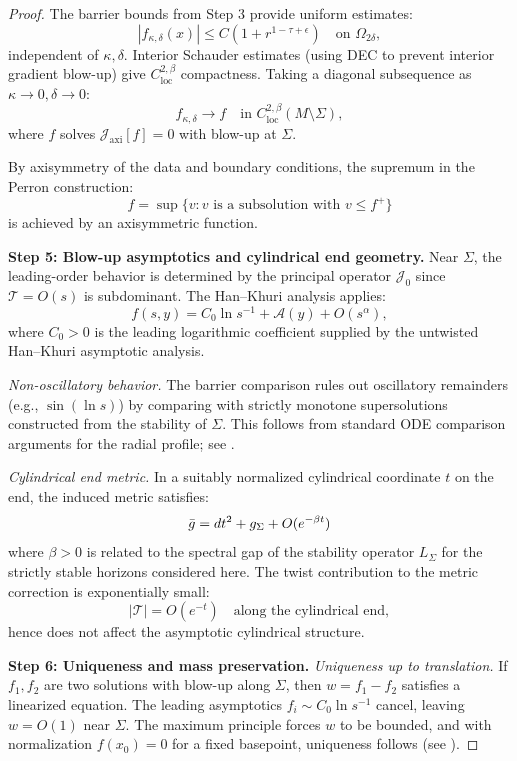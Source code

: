 \begin{proof}
The barrier bounds from Step 3 provide uniform estimates:
\[
|f_{\kappa,\delta}(x)| \leq C(1 + r^{1-\tau+\epsilon}) \quad \text{on } \Omega_{2\delta},
\]
independent of $\kappa, \delta$. Interior Schauder estimates (using DEC to prevent interior gradient blow-up) give $C^{2,\beta}_{\text{loc}}$ compactness. Taking a diagonal subsequence as $\kappa \to 0, \delta \to 0$:
\[
f_{\kappa,\delta} \to f \quad \text{in } C^{2,\beta}_{\text{loc}}(M \setminus \Sigma),
\]
where $f$ solves $\mathcal{J}_{\text{axi}}[f] = 0$ with blow-up at $\Sigma$.

By axisymmetry of the data and boundary conditions, the supremum in the Perron construction:
\[
f = \sup\{v : v \text{ is a subsolution with } v \leq f^+\}
\]
is achieved by an axisymmetric function.

\textbf{Step 5: Blow-up asymptotics and cylindrical end geometry.}
Near $\Sigma$, the leading-order behavior is determined by the principal operator $\mathcal{J}_0$ since $\mathcal{T} = O(s)$ is subdominant. The Han--Khuri analysis \cite[Proposition 4.5]{hankhuri2013} applies:
\[
f(s, y) = C_0 \ln s^{-1} + \mathcal{A}(y) + O(s^\alpha),
\]
where $C_0>0$ is the leading logarithmic coefficient supplied by the untwisted Han--Khuri asymptotic analysis.

\textit{Non-oscillatory behavior.} The barrier comparison rules out oscillatory remainders (e.g., $\sin(\ln s)$) by comparing with strictly monotone supersolutions constructed from the stability of $\Sigma$. This follows from standard ODE comparison arguments for the radial profile; see \cite[Section 5]{hankhuri2013}.

\textit{Cylindrical end metric.} In a suitably normalized cylindrical coordinate $t$ on the end, the induced metric satisfies:
\[
\bar{g} = dt^2 + g_\Sigma + O(e^{-\beta t})
\]
where $\beta > 0$ is related to the spectral gap of the stability operator $L_\Sigma$ for the strictly stable horizons considered here. The twist contribution to the metric correction is exponentially small:
\[
|\mathcal{T}| = O(e^{-t}) \quad \text{along the cylindrical end},
\]
hence does not affect the asymptotic cylindrical structure.

\textbf{Step 6: Uniqueness and mass preservation.}
\textit{Uniqueness up to translation.} If $f_1, f_2$ are two solutions with blow-up along $\Sigma$, then $w = f_1 - f_2$ satisfies a linearized equation. The leading asymptotics $f_i \sim C_0 \ln s^{-1}$ cancel, leaving $w = O(1)$ near $\Sigma$. The maximum principle forces $w$ to be bounded, and with normalization $f(x_0) = 0$ for a fixed basepoint, uniqueness follows (see \cite[Theorem 3.1]{hankhuri2013}).


\end{proof}
